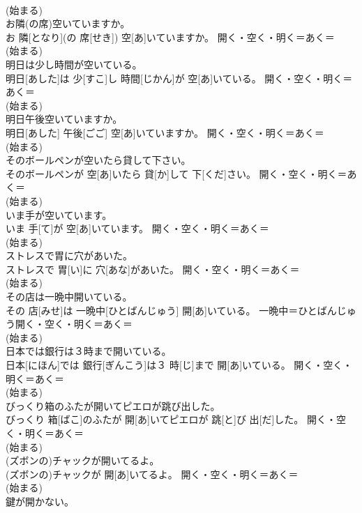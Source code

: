\documentclass[8pt]{extreport}
\begin{document}
\begin{CJK}{UTF8}{min}
{\\	(始まる) 
\\	お隣(の席)空いていますか。	
\\	お 隣[となり](の 席[せき]) 空[あ]いていますか。	開く・空く・明く＝あく＝ 
\\	(始まる) 
\\	明日は少し時間が空いている。	
\\	明日[あした]は 少[すこ]し 時間[じかん]が 空[あ]いている。	開く・空く・明く＝あく＝ 
\\	(始まる) 
\\	明日午後空いていますか。	
\\	明日[あした] 午後[ごご] 空[あ]いていますか。	開く・空く・明く＝あく＝ 
\\	(始まる) 
\\	そのボールペンが空いたら貸して下さい。	
\\	そのボールペンが 空[あ]いたら 貸[か]して 下[くだ]さい。	開く・空く・明く＝あく＝ 
\\	(始まる) 
\\	いま手が空いています。	
\\	いま 手[て]が 空[あ]いています。	開く・空く・明く＝あく＝ 
\\	(始まる) 
\\	ストレスで胃に穴があいた。	
\\	ストレスで 胃[い]に 穴[あな]があいた。	開く・空く・明く＝あく＝ 
\\	(始まる) 
\\	その店は一晩中開いている。	
\\	その 店[みせ]は 一晩中[ひとばんじゅう] 開[あ]いている。	一晩中＝ひとばんじゅう開く・空く・明く＝あく＝ 
\\	(始まる) 
\\	日本では銀行は３時まで開いている。	
\\	日本[にほん]では 銀行[ぎんこう]は３ 時[じ]まで 開[あ]いている。	開く・空く・明く＝あく＝ 
\\	(始まる) 
\\	びっくり箱のふたが開いてピエロが跳び出した。	
\\	びっくり 箱[ばこ]のふたが 開[あ]いてピエロが 跳[と]び 出[だ]した。	開く・空く・明く＝あく＝ 
\\	(始まる) 
\\	(ズボンの)チャックが開いてるよ。	
\\	(ズボンの)チャックが 開[あ]いてるよ。	開く・空く・明く＝あく＝ 
\\	(始まる) 
\\	鍵が開かない。	
}
\end{CJK}
\end{document}
